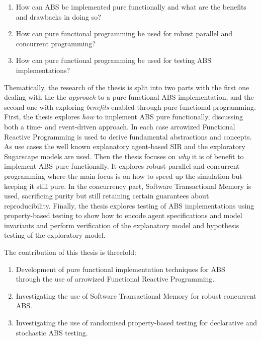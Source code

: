 \begin{enumerate}
	\item How can ABS be implemented pure functionally and what are the benefits and drawbacks in doing so?
	\item How can pure functional programming be used for robust parallel and concurrent programming? 
	\item How can pure functional programming be used for testing ABS implementations?
\end{enumerate}

Thematically, the research of the thesis is split into two parts with the first one dealing with the the \textit{approach} to a pure functional ABS implementation, and the second one with exploring \textit{benefits} enabled through pure functional programming.
First, the thesis explores \textit{how} to implement ABS pure functionally, discussing both a time- and event-driven approach. In each case arrowized Functional Reactive Programming is used to derive fundamental abstractions and concepts. As use cases the well known explanatory agent-based SIR and the exploratory Sugarscape models are used. Then the thesis focuses on \textit{why} it is of benefit to implement ABS pure functionally. It explores robust parallel and concurrent programming where the main focus is on how to speed up the simulation but keeping it still pure. In the concurrency part, Software Transactional Memory is used, sacrificing purity but still retaining certain guarantees about reproducibility. Finally, the thesis explores testing of ABS implementations using property-based testing to show how to encode agent specifications and model invariants and perform verification of the explanatory model and hypothesis testing of the exploratory model.

The contribution of this thesis is threefold:
\begin{enumerate}
	\item Development of pure functional implementation techniques for ABS \\ through the use of arrowized Functional Reactive Programming.
	\item Investigating the use of Software Transactional Memory for robust concurrent ABS.
	\item Investigating the use of randomised property-based testing for declarative and stochastic ABS testing.
\end{enumerate}

